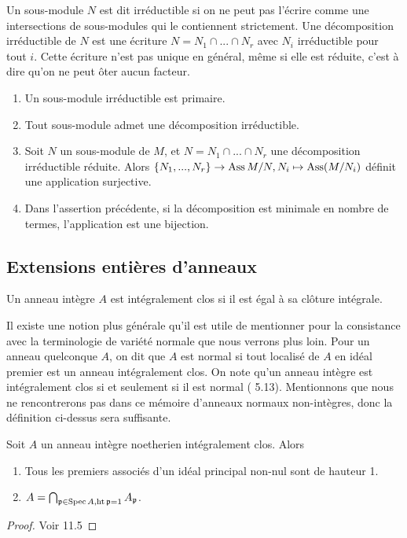 Un sous-module $N$ est dit irréductible si on ne peut pas l'écrire comme une intersections de sous-modules qui le contiennent strictement. Une décomposition irréductible de $N$ est une écriture $N=N_1\cap...\cap N_r$ avec $N_i$ irréductible pour tout $i$. Cette écriture n'est pas unique en général, même si elle est réduite, c'est à dire qu'on ne peut ôter aucun facteur. 

\begin{thm}
\begin{enumerate}
\item Un sous-module irréductible est primaire.
\item Tout sous-module admet une décomposition irréductible.
\item Soit $N$ un sous-module de $M$, et $N=N_1\cap...\cap N_r$ une décomposition irréductible réduite. Alors $\lbrace N_1,...,N_r\rbrace\rightarrow \operatorname{Ass} M/N, N_i\mapsto \operatorname{Ass}(M/N_i)$ définit une application surjective.
\item Dans l'assertion précédente, si la décomposition est minimale en nombre de termes, l'application est une bijection.
\end{enumerate}
\end{thm}

\subsection{Extensions entières d'anneaux}

\begin{defn}\label{normalring}
Un anneau intègre $A$ est intégralement clos si il est égal à sa clôture intégrale. 
\end{defn}

\begin{rem}
Il existe une notion plus générale qu'il est utile de mentionner pour la consistance avec la terminologie de variété normale que nous verrons plus loin. Pour un anneau quelconque $A$, on dit que $A$ est normal si tout localisé de $A$ en idéal premier est un anneau intégralement clos. On note qu'un anneau intègre est intégralement clos si et seulement si il est normal (\cite{atiyahmacdo} 5.13). Mentionnons que nous ne rencontrerons pas dans ce mémoire d'anneaux normaux non-intègres, donc la définition ci-dessus sera suffisante.
\end{rem}


\begin{thm}\label{factonormal}
Soit $A$ un anneau intègre noetherien intégralement clos. Alors
\begin{enumerate}
\item Tous les premiers associés d'un idéal principal non-nul sont de hauteur 1.
\item $A=\bigcap_{\mathfrak{p}\in \operatorname{Spec} A, \operatorname{ht} \mathfrak{p}=1} A_\mathfrak{p}$.
\end{enumerate}
\end{thm}
\begin{proof}
Voir \cite{Matsumura} 11.5
\end{proof}


